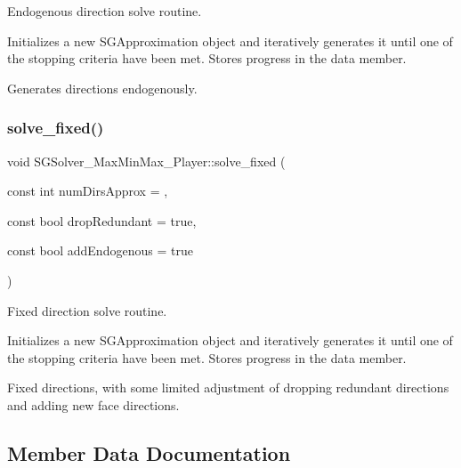 Endogenous direction solve routine. 

Initializes a new S\+G\+Approximation object and iteratively generates it until one of the stopping criteria have been met. Stores progress in the data member.

Generates directions endogenously. \mbox{\label{classSGSolver__MaxMinMax__3Player_aaf5e24f4a90e8ec1541f3cf1c1aea9e6}} 
\subsubsection{\texorpdfstring{solve\+\_\+fixed()}{solve\_fixed()}}
{\footnotesize\ttfamily void S\+G\+Solver\+\_\+\+Max\+Min\+Max\+\_\+Player\+::solve\+\_\+fixed (\begin{DoxyParamCaption}\item[{const int}]{num\+Dirs\+Approx = {},  }\item[{const bool}]{drop\+Redundant = {\ttfamily true},  }\item[{const bool}]{add\+Endogenous = {\ttfamily true} }\end{DoxyParamCaption})}



Fixed direction solve routine. 

Initializes a new S\+G\+Approximation object and iteratively generates it until one of the stopping criteria have been met. Stores progress in the data member.

Fixed directions, with some limited adjustment of dropping redundant directions and adding new face directions. 

\subsection{Member Data Documentation}
\mbox{\label{classSGSolver__MaxMinMax__3Player_ace3cdb3d3a60e9c43d0a23e8d716080a}} 
